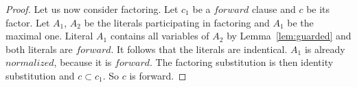 \documentclass[english, shortabstract]{iithesis}
\theoremstyle{definition} \newtheorem{definition}{Definition}[chapter]
\theoremstyle{remark} \newtheorem{remark}[definition]{Observation}
\theoremstyle{plain} \newtheorem{theorem}[definition]{Theorem}
\theoremstyle{plain} \newtheorem{lemma}[definition]{Lemma}
\begin{document}
\begin{proof}

\par Let us now consider factoring. Let $c_1$ be a $forward$ clause and $c$ be its factor.
Let $A_1$, $A_2$ be the literals participating in factoring and $A_1$ be the maximal one.
Literal $A_1$ contains all variables of $A_2$ by Lemma~\ref{lem:guarded} and both literals are $forward$. 
It follows that the literals are indentical. $A_1$ is already $normalized$, because it is $forward$.
The factoring substitution is then identity substitution and $c\subset c_1$. So $c$ is forward.
\end{proof}
\end{document}
